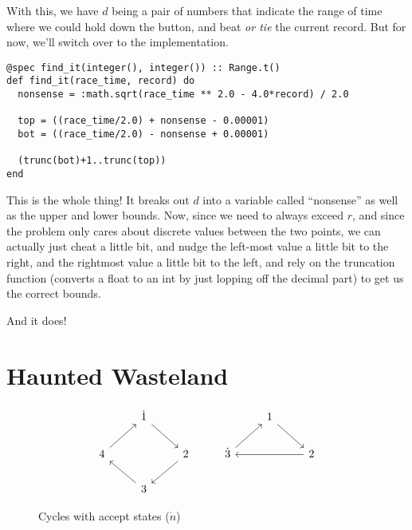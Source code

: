 \documentclass{article}
\begin{document}
With this, we have $d$ being a pair of numbers that indicate the range of time where we could hold down the button, and beat \emph{or tie} the current record. But for now, we'll switch over to the implementation.

\begin{verbatim}
@spec find_it(integer(), integer()) :: Range.t()
def find_it(race_time, record) do
  nonsense = :math.sqrt(race_time ** 2.0 - 4.0*record) / 2.0

  top = ((race_time/2.0) + nonsense - 0.00001)
  bot = ((race_time/2.0) - nonsense + 0.00001)

  (trunc(bot)+1..trunc(top))
end
\end{verbatim}

This is the whole thing! It breaks out $d$ into a variable called ``nonsense'' as well as the upper and lower bounds. Now, since we need to always exceed $r$, and since the problem only cares about discrete values between the two points, we can actually just cheat a little bit, and nudge the left-most value a little bit to the right, and the rightmost value a little bit to the left, and rely on the truncation function (converts a float to an int by just lopping off the decimal part) to get us the correct bounds.

And it does!


\setcounter{section}{7}
\section{Haunted Wasteland}
\begin{figure*}[h]
  \centering
\[\begin{tikzcd}
	& {\dot{1}} &&& 1 \\
	4 && 2 & {\dot{3}} && 2 \\
	& 3
	\arrow[from=1-2, to=2-3]
	\arrow[from=2-3, to=3-2]
	\arrow[from=3-2, to=2-1]
	\arrow[from=2-1, to=1-2]
	\arrow[from=1-5, to=2-6]
	\arrow[from=2-6, to=2-4]
	\arrow[from=2-4, to=1-5]
\end{tikzcd}\]

\caption{Cycles with accept states ($\dot{n}$)}
\end{figure*}


\NewDocumentCommand{}
\end{document}
